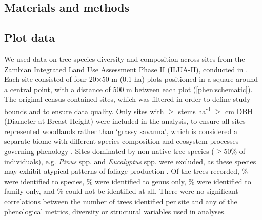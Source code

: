 \begin{refsection}
\section{Materials and methods}
\label{phen:sec:methods}

\subsection{Plot data}
\label{phen:ssec:plots}

We used data on tree species diversity and composition across \nSites{} sites from the Zambian Integrated Land Use Assessment Phase II (ILUA-II), conducted in \censusDate{} \citep{Mukosha2009, Pelletier2018}. Each site consisted of four 20$\times$50 m (0.1 ha) plots positioned in a square around a central point, with a distance of 500 m between each plot (\autoref{phen:schematic}). The original census contained \nTotalSites{} sites, which was filtered in order to define study bounds and to ensure data quality. Only sites with $\geq$\treesHa{} stems ha\textsuperscript{-1} $\geq$\stemSize{} cm DBH (Diameter at Breast Height) were included in the analysis, to ensure all sites represented woodlands rather than `grassy savanna', which is considered a separate biome with different species composition and ecosystem processes governing phenology \citep{Parr2014}. Sites dominated by non-native tree species ($\geq$50\% of individuals), e.g. \textit{Pinus} spp. and \textit{Eucalyptus} spp. were excluded, as these species may exhibit atypical patterns of foliage production \citep{Broadhead2003}. Of the \nTrees{} trees recorded, \perSp{}\% were identified to species, \perGen{}\% were identified to genus only, \perFam{}\% were identified to family only, and \perIndet{}\% could not be identified at all. There were no significant correlations between the number of trees identified per site and any of the phenological metrics, diversity or structural variables used in analyses.


\end{refsection}

